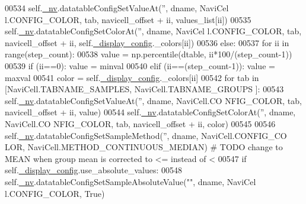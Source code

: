 \begin{DoxyCode}
00534                             self.\hyperlink{classnavicom_1_1navicom_1_1NaviCom_afff3fd56fa16a68bab52ba8d801e325a}{_nv}.datatableConfigSetValueAt(\textcolor{stringliteral}{''}, dname, NaviCel
      l.CONFIG\_COLOR, tab, navicell\_offset + ii, values\_list[ii])
00535                             self.\hyperlink{classnavicom_1_1navicom_1_1NaviCom_afff3fd56fa16a68bab52ba8d801e325a}{_nv}.datatableConfigSetColorAt(\textcolor{stringliteral}{''}, dname, NaviCel
      l.CONFIG\_COLOR, tab, navicell\_offset + ii, self.\hyperlink{classnavicom_1_1navicom_1_1NaviCom_ab8ddca454f674629472d8bfec46ac76f}{_display_config}.\_colors[ii])
00536             \textcolor{keywordflow}{else}:
00537                 \textcolor{keywordflow}{for} ii \textcolor{keywordflow}{in} range(step\_count):
00538                     value = np.percentile(dtable, ii*100/(step\_count-1))
00539                     \textcolor{keywordflow}{if} (ii==0): value = minval
00540                     \textcolor{keywordflow}{elif} (ii==(step\_count-1)): value = maxval
00541                     color = self.\hyperlink{classnavicom_1_1navicom_1_1NaviCom_ab8ddca454f674629472d8bfec46ac76f}{_display_config}.\_colors[ii]
00542                     \textcolor{keywordflow}{for} tab \textcolor{keywordflow}{in} [NaviCell.TABNAME\_SAMPLES, NaviCell.TABNAME\_GROUPS
      ]:
00543                         self.\hyperlink{classnavicom_1_1navicom_1_1NaviCom_afff3fd56fa16a68bab52ba8d801e325a}{_nv}.datatableConfigSetValueAt(\textcolor{stringliteral}{''}, dname, NaviCell.CO
      NFIG\_COLOR, tab, navicell\_offset + ii, value)
00544                         self.\hyperlink{classnavicom_1_1navicom_1_1NaviCom_afff3fd56fa16a68bab52ba8d801e325a}{_nv}.datatableConfigSetColorAt(\textcolor{stringliteral}{''}, dname, NaviCell.CO
      NFIG\_COLOR, tab, navicell\_offset + ii, color)
00545 
00546             self.\hyperlink{classnavicom_1_1navicom_1_1NaviCom_afff3fd56fa16a68bab52ba8d801e325a}{_nv}.datatableConfigSetSampleMethod(\textcolor{stringliteral}{''}, dname, NaviCell.CONFIG\_CO
      LOR, NaviCell.METHOD\_CONTINUOUS\_MEDIAN) \textcolor{comment}{# TODO change to MEAN when group mean is 
      corrected to <= instead of <}
00547             \textcolor{keywordflow}{if} self.\hyperlink{classnavicom_1_1navicom_1_1NaviCom_ab8ddca454f674629472d8bfec46ac76f}{_display_config}.use\_absolute\_values:
00548                 self.\hyperlink{classnavicom_1_1navicom_1_1NaviCom_afff3fd56fa16a68bab52ba8d801e325a}{_nv}.datatableConfigSetSampleAbsoluteValue(\textcolor{stringliteral}{""}, dname, NaviCel
      l.CONFIG\_COLOR, \textcolor{keyword}{True})

\end{DoxyCode}
